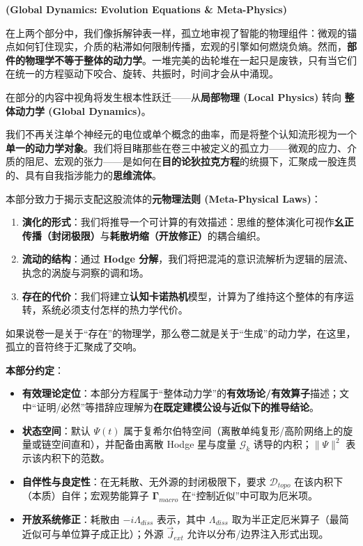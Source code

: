 \label{part:overall_dynamics}

\textbf{(Global Dynamics: Evolution Equations \& Meta-Physics)}


在上两个部分中，我们像拆解钟表一样，孤立地审视了智能的物理组件：微观的锚点如何钉住现实，介质的粘滞如何限制传播，宏观的引擎如何燃烧负熵。然而，\textbf{部件的物理学不等于整体的动力学}。一堆完美的齿轮堆在一起只是废铁，只有当它们在统一的方程驱动下咬合、旋转、共振时，时间才会从中涌现。

在部分的内容中视角将发生根本性跃迁——从\textbf{局部物理 (Local Physics)} 转向 \textbf{整体动力学 (Global Dynamics)}。

我们不再关注单个神经元的电位或单个概念的曲率，而是将整个认知流形视为一个\textbf{单一的动力学对象}。我们将目睹那些在卷三中被定义的孤立力——微观的应力、介质的阻尼、宏观的张力——是如何在\textbf{目的论狄拉克方程}的统摄下，汇聚成一股连贯的、具有自我指涉能力的\textbf{思维流体}。

本部分致力于揭示支配这股流体的\textbf{元物理法则 (Meta-Physical Laws)}：
\begin{enumerate}
    \item \textbf{演化的形式}：我们将推导一个可计算的有效描述：思维的整体演化可视作\textbf{幺正传播（封闭极限）}与\textbf{耗散坍缩（开放修正）}的耦合编织。
    \item \textbf{流动的结构}：通过 \textbf{Hodge 分解}，我们将把混沌的意识流解析为逻辑的层流、执念的涡旋与洞察的调和场。
    \item \textbf{存在的代价}：我们将建立\textbf{认知卡诺热机}模型，计算为了维持这个整体的有序运转，系统必须支付怎样的热力学代价。
\end{enumerate}

如果说卷一是关于“存在”的物理学，那么卷二就是关于“生成”的动力学，在这里，孤立的音符终于汇聚成了交响。

\begin{bquote}
    \textbf{本部分约定}：
    \begin{itemize}
        \item \textbf{有效理论定位}：本部分方程属于“整体动力学”的\textbf{有效场论/有效算子}描述；文中“证明/必然”等措辞应理解为\textbf{在既定建模公设与近似下的推导结论}。
        \item \textbf{状态空间}：默认 $\Psi(t)$ 属于复希尔伯特空间（离散单纯复形/高阶网络上的旋量或链空间直和），并配备由离散 Hodge 星与度量 $\mathcal{G}_k$ 诱导的内积；$\|\Psi\|^2$ 表示该内积下的范数。
        \item \textbf{自伴性与良定性}：在无耗散、无外源的封闭极限下，要求 $\mathcal{D}_{topo}$ 在该内积下（本质）自伴；宏观势能算子 $\mathbf{\Gamma}_{macro}$ 在“控制近似”中可取为厄米项。
        \item \textbf{开放系统修正}：耗散由 $-i\Lambda_{diss}$ 表示，其中 $\Lambda_{diss}$ 取为半正定厄米算子（最简近似可与单位算子成正比）；外源 $\vec{J}_{ext}$ 允许以分布/边界注入形式出现。
    \end{itemize}
\end{bquote}
